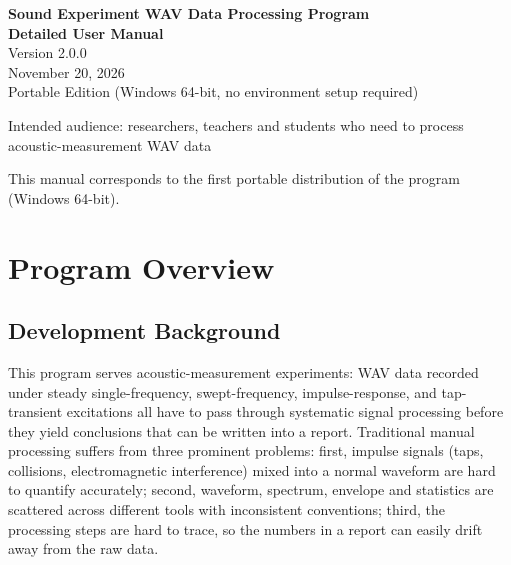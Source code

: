 \documentclass[UTF8,a4paper,12pt]{ctexart}
\begin{document}
\begin{titlepage}
\centering
\vspace*{2.5cm}
{\fontsize{22}{26}\selectfont\bfseries Sound Experiment WAV Data Processing Program}\\[0.8cm]
{\fontsize{26}{30}\selectfont\bfseries Detailed User Manual}\\[1.2cm]
{\large Version 2.0.0}\\[0.3cm]
{\large November 20, 2026}\\[0.6cm]
{\large Portable Edition (Windows 64-bit, no environment setup required)}\\[2.0cm]

\begin{minipage}{0.78\textwidth}
\centering
\large
Intended audience: researchers, teachers and students who need to process acoustic-measurement WAV data
\end{minipage}

\vfill
{\small This manual corresponds to the first portable distribution of the program (Windows 64-bit).}
\end{titlepage}

\newpage

\tableofcontents
\newpage

\section{Program Overview}

\subsection{Development Background}

This program serves acoustic-measurement experiments: WAV data recorded under steady single-frequency, swept-frequency, impulse-response, and tap-transient excitations all have to pass through systematic signal processing before they yield conclusions that can be written into a report. Traditional manual processing suffers from three prominent problems: first, impulse signals (taps, collisions, electromagnetic interference) mixed into a normal waveform are hard to quantify accurately; second, waveform, spectrum, envelope and statistics are scattered across different tools with inconsistent conventions; third, the processing steps are hard to trace, so the numbers in a report can easily drift away from the raw data.
\end{document}
